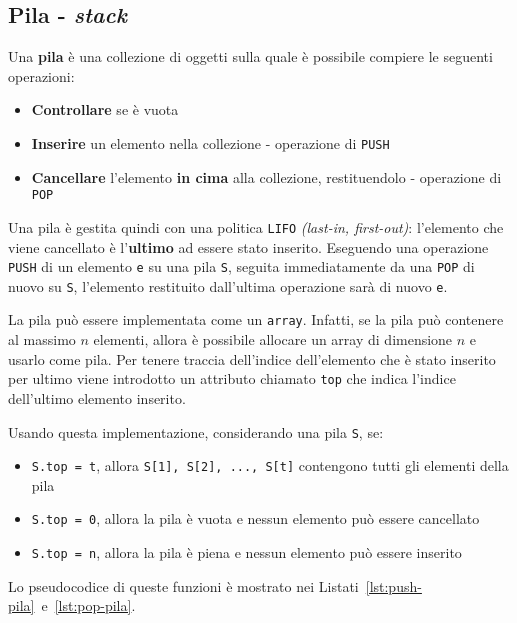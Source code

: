\documentclass[italian, 10pt]{article}
\begin{document}
\subsection{Pila - \textit{stack}}

Una \textbf{pila} è una collezione di oggetti sulla quale è possibile compiere le seguenti operazioni:

\begin{itemize}
  \item \textbf{Controllare} se è vuota
  \item \textbf{Inserire} un elemento nella collezione - operazione di \texttt{PUSH}
  \item \textbf{Cancellare} l'elemento \textbf{in cima} alla collezione, restituendolo - operazione di \texttt{POP}
\end{itemize}

Una pila è gestita quindi con una politica \texttt{LIFO} \textit{(last-in, first-out)}: l'elemento che viene cancellato è l'\textbf{ultimo} ad essere stato inserito.
Eseguendo una operazione \texttt{PUSH} di un elemento \texttt{e} su una pila \texttt{S}, seguita immediatamente da una \texttt{POP} di nuovo su \texttt{S}, l'elemento restituito dall'ultima operazione sarà di nuovo \texttt{e}.

\bigskip
La pila può essere implementata come un \texttt{array}.
Infatti, se la pila può contenere al massimo \(n\) elementi, allora è possibile allocare un array di dimensione \(n\) e usarlo come pila.
Per tenere traccia dell'indice dell'elemento che è stato inserito per ultimo viene introdotto un attributo chiamato \texttt{top} che indica l'indice dell'ultimo elemento inserito.

Usando questa implementazione, considerando una pila \texttt{S}, se:

\begin{itemize}
  \item \texttt{S.top = t}, allora \texttt{S[1], S[2], ..., S[t]} contengono tutti gli elementi della pila
  \item \texttt{S.top = 0}, allora la pila è vuota e nessun elemento può essere cancellato
  \item \texttt{S.top = n}, allora la pila è piena e nessun elemento può essere inserito
\end{itemize}

\bigskip
Lo pseudocodice di queste funzioni è mostrato nei Listati~\ref{lst:push-pila}~e~\ref{lst:pop-pila}.
\end{document}
